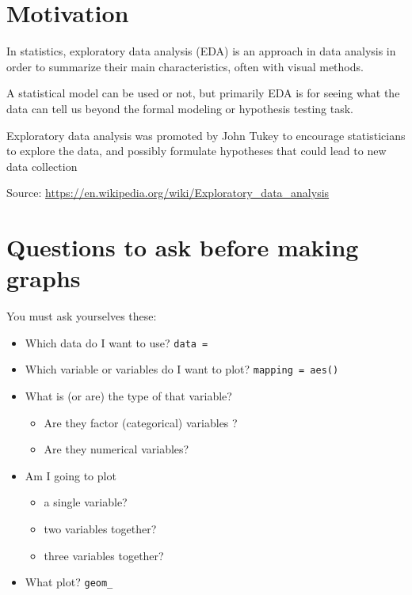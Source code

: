 \documentclass[
]{book}
\providecommand{\tightlist}{%
  \setlength{\itemsep}{0pt}\setlength{\parskip}{0pt}}
\begin{document}
\hypertarget{motivation}{%
\section{Motivation}\label{motivation}}

In statistics, exploratory data analysis (EDA) is an approach in data analysis in order to summarize their main characteristics, often with visual methods.

A statistical model can be used or not, but primarily EDA is for seeing what the data can tell us beyond the formal modeling or hypothesis testing task.

Exploratory data analysis was promoted by John Tukey to encourage statisticians to explore the data, and possibly formulate hypotheses that could lead to new data collection

Source: \url{https://en.wikipedia.org/wiki/Exploratory_data_analysis}

\hypertarget{questions-to-ask-before-making-graphs-1}{%
\section{Questions to ask before making graphs}\label{questions-to-ask-before-making-graphs-1}}

You must ask yourselves these:

\begin{itemize}
\tightlist
\item
  Which data do I want to use? \texttt{data\ =}
\item
  Which variable or variables do I want to plot? \texttt{mapping\ =\ aes()}
\item
  What is (or are) the type of that variable?

  \begin{itemize}
  \tightlist
  \item
    Are they factor (categorical) variables ?
  \item
    Are they numerical variables?
  \end{itemize}
\item
  Am I going to plot

  \begin{itemize}
  \tightlist
  \item
    a single variable?
  \item
    two variables together?
  \item
    three variables together?
  \end{itemize}
\item
  What plot? \texttt{geom\_}
\end{itemize}
\end{document}
